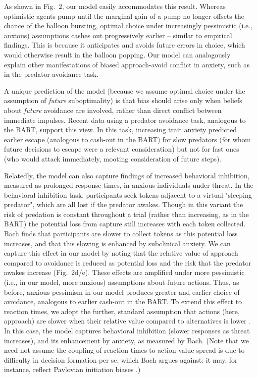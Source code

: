 \documentclass[11pt]{article} %
\begin{document}
As shown in Fig.~2, our model easily accommodates this result. Whereas optimistic agents pump until the marginal gain of a pump no longer offsets the chance of the balloon bursting, optimal choice under increasingly pessimistic (i.e., anxious) assumptions cashes out progressively earlier -- similar to empirical findings\citep{Maner2007, ramirez2015}. This is because it anticipates and avoids future errors in choice, which would otherwise result in the balloon popping. Our model can analogously explain other manifestations of biased approach-avoid conflict in anxiety, such as in the predator avoidance task\cite{fung2019}. 

A unique prediction of the model (because we assume optimal choice under the assumption of \emph{future} suboptimality) is that bias should arise only when beliefs about \emph{future} avoidance are involved, rather than direct conflict between immediate impulses. Recent data \cite{fung2019} using a predator avoidance task, analogous to the BART, support this view. In this task, increasing trait anxiety predicted earlier escape (analogous to cash-out in the BART) for slow predators (for whom future decisions to escape were a relevant consideration) but not for fast ones (who would attack immediately, mooting consideration of future steps). 

Relatedly, the model can also capture findings of increased behavioral inhibition, measured as prolonged response times, in anxious individuals under threat\cite{bach2015}. In the behavioral inhibition task, participants seek tokens adjacent to a virtual "sleeping predator", which are all lost if the predator awakes. Though in this variant the risk of predation is constant throughout a trial (rather than increasing, as in the BART) the potential loss from capture still increases with each token collected. Bach \cite{bach2015} finds that participants are slower to collect tokens as this potential loss increases, and that this slowing is enhanced by subclinical anxiety. We can capture this effect in our model by noting that the relative value of approach compared to avoidance is reduced as potential loss and the risk that the predator awakes increase (Fig.~2d/e). These effects are amplified under more pessimistic (i.e., in our model, more anxious) assumptions about future actions. Thus, as before, anxious pessimism in our model produces greater and earlier choice of avoidance, analogous to earlier cash-out in the BART. To extend this effect to reaction times, we adopt the further, standard assumption that actions (here, approach) are slower when their relative value compared to alternatives is lower \citep{oud2016}. In this case, the model captures behavioral inhibition (slower responses as threat increases), and its enhancement by anxiety, as measured by Bach. (Note that we need not assume the coupling of reaction times to action value spread is due to difficulty in decision formation per se, which Bach argues against: it may, for instance, reflect Pavlovian initiation biases \cite{niv2007}.)
\end{document}
